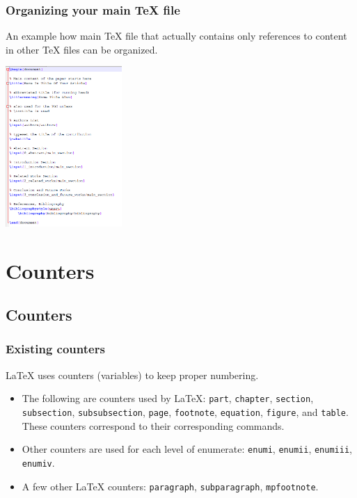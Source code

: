 \begin{frame}  \frametitle{Organizing your main TeX file}
	
	An example how main TeX file that actually contains only references to content in other TeX files can be organized.
	
	\vspace{0.2cm}
	
	\begin{center}
		\includegraphics[height=2.4in]{tips/images/sampleMainTeXFile}
	\end{center}
	
\end{frame}





\section[Counters]{Counters}
\subsection[Counters]{Counters}

\begin{frame}  \frametitle{Existing counters}
	LaTeX uses counters (variables) to keep proper numbering. 
	\begin{itemize}
		\item The following are counters used by LaTeX: \texttt{\color{highlight}part}, \texttt{\color{highlight}chapter}, \texttt{\color{highlight}section}, \texttt{\color{highlight}subsection}, \texttt{\color{highlight}subsubsection}, \texttt{\color{highlight}page}, \texttt{\color{highlight}footnote}, \texttt{\color{highlight}equation}, \texttt{\color{highlight}figure}, and \texttt{\color{highlight}table}. These counters correspond to their corresponding commands.
		\item Other counters are used for each level of enumerate: \texttt{\color{highlight}enumi}, \texttt{\color{highlight}enumii}, \texttt{\color{highlight}enumiii}, \texttt{\color{highlight}enumiv}.
		\item A few other LaTeX counters: \texttt{\color{highlight}paragraph}, \texttt{\color{highlight}subparagraph}, \texttt{\color{highlight}mpfootnote}.
	\end{itemize}
\end{frame}

